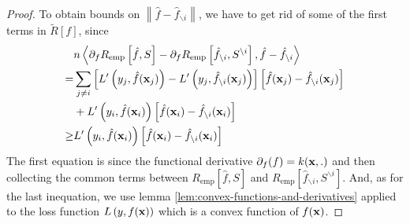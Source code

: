 \begin{proof}
	To obtain bounds on $\left\|\hat{f}-\hat{f}_{\backslash i}\right\|$, we have to get rid of some of the first terms in $\tilde{R}[f]$, since
	\begin{equation}
		\begin{aligned}
			     & n\left\langle\partial_{f}R_{\text{emp}}\left[\hat{f},S\right]-\partial_{f}R_{\text{emp}}\left[\hat{f}_{\backslash i},S^{\backslash i}\right],\hat{f}-\hat{f}_{\backslash i}\right\rangle               \\
			=    & \sum_{j\neq i}\left[L^{\prime}\left(y_{j},\hat{f}({\bf x}_{j})\right)-L^{\prime}\left(y_{j},\hat{f}_{\backslash i}({\bf x}_{j})\right)\right]\left[\hat{f}({\bf x}_{j})-\hat{f}_{\backslash i}({\bf x}_{j})\right] \\
			     & +L^{\prime}\left(y_{i},\hat{f}({\bf x}_{i})\right)\left[\hat{f}({\bf x}_{i})-\hat{f}_{\backslash i}({\bf x}_{i})\right]                                                                                         \\
			\geq & L^{\prime}\left(y_{i},\hat{f}({\bf x}_{i})\right)\left[\hat{f}({\bf x}_{i})-\hat{f}_{\backslash i}({\bf x}_{i})\right]
		\end{aligned}
	\end{equation}
	The first equation is since the functional derivative $\partial_{f}(f)=k({\bf x},.)$ and then collecting the common terms between $R_{\text{emp}}\left[\hat{f}, S\right]$ and $R_{\text{emp}}\left[\hat{f}_{\backslash i}, S^{\backslash i}\right]$. And, as for the last inequation, we use lemma \ref{lem:convex-functions-and-derivatives} applied to the loss function $L\left(y,f({\bf x})\right)$ which is a convex function of $f({\bf x})$.


\end{proof}
